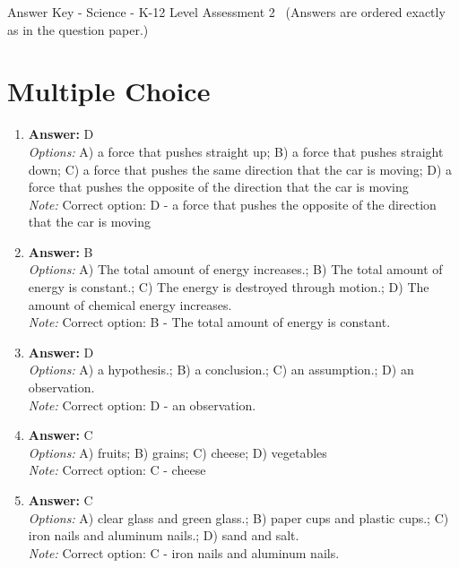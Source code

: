 \documentclass[12pt]{article}
\begin{document}
\begin{center}
Answer Key - Science - K-12 Level Assessment 2 \
\small (Answers are ordered exactly as in the question paper.)
\end{center}

\section*{Multiple Choice}
\begin{enumerate}[label=\arabic*.]
\item \textbf{Answer:} D
\\ \textit{Options:} A) a force that pushes straight up; B) a force that pushes straight down; C) a force that pushes the same direction that the car is moving; D) a force that pushes the opposite of the direction that the car is moving
\\ \textit{Note:} Correct option: D - a force that pushes the opposite of the direction that the car is moving
\item \textbf{Answer:} B
\\ \textit{Options:} A) The total amount of energy increases.; B) The total amount of energy is constant.; C) The energy is destroyed through motion.; D) The amount of chemical energy increases.
\\ \textit{Note:} Correct option: B - The total amount of energy is constant.
\item \textbf{Answer:} D
\\ \textit{Options:} A) a hypothesis.; B) a conclusion.; C) an assumption.; D) an observation.
\\ \textit{Note:} Correct option: D - an observation.
\item \textbf{Answer:} C
\\ \textit{Options:} A) fruits; B) grains; C) cheese; D) vegetables
\\ \textit{Note:} Correct option: C - cheese
\item \textbf{Answer:} C
\\ \textit{Options:} A) clear glass and green glass.; B) paper cups and plastic cups.; C) iron nails and aluminum nails.; D) sand and salt.
\\ \textit{Note:} Correct option: C - iron nails and aluminum nails.
\end{enumerate}
\end{document}
